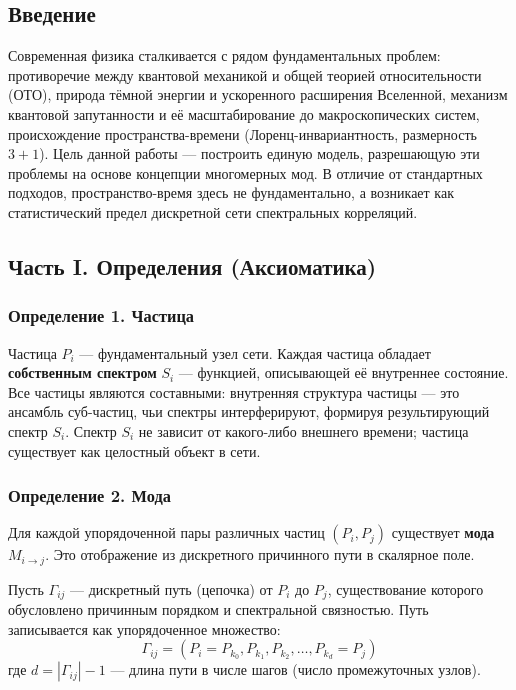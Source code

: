 \documentclass[12pt,a4paper]{article}
\begin{document}
\subsection{Введение}
Современная физика сталкивается с рядом фундаментальных проблем: противоречие между квантовой механикой и общей теорией относительности (ОТО), природа тёмной энергии и ускоренного расширения Вселенной, механизм квантовой запутанности и её масштабирование до макроскопических систем, происхождение пространства-времени (Лоренц-инвариантность, размерность $3+1$). Цель данной работы --- построить единую модель, разрешающую эти проблемы на основе концепции многомерных мод. В отличие от стандартных подходов, пространство-время здесь не фундаментально, а возникает как статистический предел дискретной сети спектральных корреляций.

\subsection{Часть I. Определения (Аксиоматика)}

\subsubsection{Определение 1. Частица}
Частица $P_i$ --- фундаментальный узел сети. Каждая частица обладает \textbf{собственным спектром} $S_i$ --- функцией, описывающей её внутреннее состояние. Все частицы являются составными: внутренняя структура частицы --- это ансамбль суб-частиц, чьи спектры интерферируют, формируя результирующий спектр $S_i$. Спектр $S_i$ не зависит от какого-либо внешнего времени; частица существует как целостный объект в сети.

\subsubsection{Определение 2. Мода}
Для каждой упорядоченной пары различных частиц $(P_i, P_j)$ существует \textbf{мода} $M_{i \to j}$. Это отображение из дискретного причинного пути в скалярное поле.

Пусть $\Gamma_{ij}$ --- дискретный путь (цепочка) от $P_i$ до $P_j$, существование которого обусловлено причинным порядком и спектральной связностью. Путь записывается как упорядоченное множество:
\begin{equation}
    \Gamma_{ij} = (P_i = P_{k_0}, P_{k_1}, P_{k_2}, \dots, P_{k_d} = P_j)
\end{equation}
где $d = |\Gamma_{ij}| - 1$ --- длина пути в числе шагов (число промежуточных узлов).
\end{document}

